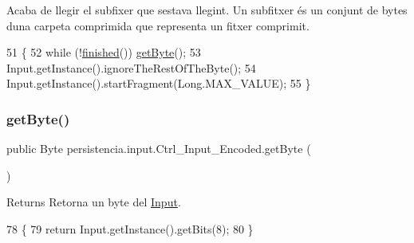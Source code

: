 Acaba de llegir el subfixer que s\textquotesingle{}estava llegint. Un subfitxer és un conjunt de bytes d\textquotesingle{}una carpeta comprimida que representa un fitxer comprimit. 


\begin{DoxyCode}
51                              \{
52         \textcolor{keywordflow}{while} (!\hyperlink{classpersistencia_1_1input_1_1Ctrl__Input_a5a94d207dce0fd592b5ac17f55154d4f}{finished}()) \hyperlink{classpersistencia_1_1input_1_1Ctrl__Input__Encoded_a38ede6bc49251e77ae4be30ccc06457d}{getByte}();
53         Input.getInstance().ignoreTheRestOfTheByte();
54         Input.getInstance().startFragment(Long.MAX\_VALUE);
55     \}
\end{DoxyCode}
\mbox{\label{classpersistencia_1_1input_1_1Ctrl__Input__Encoded_a38ede6bc49251e77ae4be30ccc06457d}} 
\subsubsection{\texorpdfstring{get\+Byte()}{getByte()}}
{\footnotesize\ttfamily public Byte persistencia.\+input.\+Ctrl\+\_\+\+Input\+\_\+\+Encoded.\+get\+Byte (\begin{DoxyParamCaption}{ }\end{DoxyParamCaption})\hspace{0.3cm}{\ttfamily [inline]}}

\begin{DoxyReturn}{Returns}
Retorna un byte del \hyperlink{classpersistencia_1_1input_1_1Input}{Input}. 
\end{DoxyReturn}

\begin{DoxyCode}
78                           \{
79         \textcolor{keywordflow}{return} Input.getInstance().getBits(8);
80     \}
\end{DoxyCode}
\mbox{\label{classpersistencia_1_1input_1_1Ctrl__Input__Encoded_aed32b42778121e7e55d8338d9eaaddb9}} 
